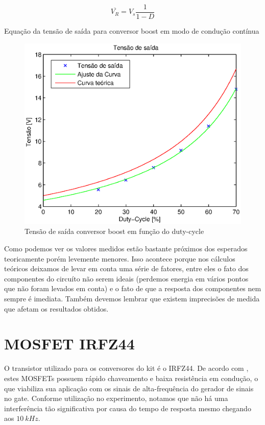 \documentclass{article}
\begin{document}
\begin{capequ}[H]
	\begin{equation}
	\overline{V_R} = V_s\frac{1}{1 - D}
	\end{equation}
	\caption{Equação da tensão de saída para conversor boost em modo de condução contínua}
	\label{eq:bod}
\end{capequ}


\begin{figure}[H]
	\centering
	\includegraphics[width=0.7\linewidth]{Dados/boost/tvd}
	\caption{Tensão de saída conversor boost em função do duty-cycle}
	\label{fig:botvd}
\end{figure}

Como podemos ver os valores medidos estão bastante próximos dos esperados teoricamente porém levemente menores. Isso acontece porque nos cálculos teóricos deixamos de levar em conta uma série de fatores, entre eles o fato dos componentes do circuíto não serem ideais (perdemos energia em vários pontos que não foram levados em conta) e o fato de que a resposta dos componentes nem sempre é imediata. Também devemos lembrar que existem imprecisões de medida que afetam os resultados obtidos.

\section{MOSFET IRFZ44}

O transistor utilizado para os conversores do kit é o IRFZ44. De acordo com \cite{bb:vishay}, estes MOSFETs possuem rápido chaveamento e baixa resistência em condução, o que viabiliza sua aplicação com os sinais de alta-frequência do gerador de sinais no gate. Conforme utilização no experimento, notamos que não há uma interferência tão significativa por causa do tempo de resposta mesmo chegando aos $10\ kHz$.
\end{document}
